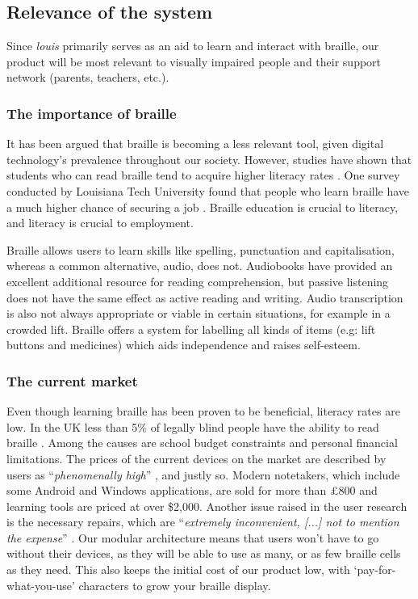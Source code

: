 \documentclass{article}
\begin{document}
\subsection{Relevance of the system} 

Since \emph{louis} primarily serves as an aid to learn and interact with braille, our product will be most relevant to visually impaired people and their support network (parents, teachers, etc.).

\subsubsection{The importance of braille}

It has been argued that braille is becoming a less relevant tool, given digital technology's prevalence throughout our society. However, studies have shown that students who can read braille tend to acquire higher literacy rates \cite{earlybraille}. One survey conducted by Louisiana Tech University found that people who learn braille have a much higher chance of securing a job \cite{transformingbraille}. Braille education is crucial to literacy, and literacy is crucial to employment.

Braille allows users to learn skills like spelling, punctuation and capitalisation, whereas a common alternative, audio, does not. Audiobooks have provided an excellent additional resource for reading comprehension, but passive listening does not have the same effect as active reading and writing. Audio transcription is also not always appropriate or viable in certain situations, for example in a crowded lift. Braille offers a system for labelling all kinds of items (e.g: lift buttons and medicines) which aids independence and raises self-esteem.

\subsubsection{The current market}

Even though learning braille has been proven to be beneficial, literacy rates are low. In the UK less than 5\% of legally blind people have the ability to read braille \cite{brailleprofiling}. Among the causes are school budget constraints and personal financial limitations. The prices of the current devices on the market are described by users as ``\emph{phenomenally high}'' \cite{brailledisplays}, and justly so. Modern notetakers, which include some Android and Windows applications, are sold for more than \pounds 800 and learning tools are priced at over \$2,000. Another issue raised in the user research is the necessary repairs, which are ``\emph{extremely inconvenient, [...] not to mention the expense}'' \cite{brailledisplays}. Our modular architecture means that users won't have to go without their devices, as they will be able to use as many, or as few braille cells as they need. This also keeps the initial cost of our product low, with `pay-for-what-you-use' characters to grow your braille display.
\end{document}
